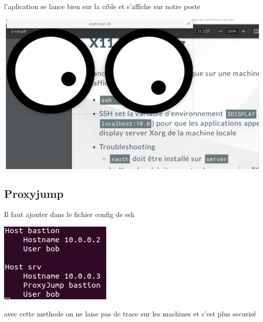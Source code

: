 \documentclass{article}
\begin{document}
 l'aplication se lance bien sur la cible et s'affiche sur notre poste
 
 \begin{center}
        \includegraphics[scale=0.5]{Images/x11result.png}
 \end{center}
 
  
  
  \subsection{\large{Proxyjump}}
  
  Il faut ajouter dans le fichier config de ssh
  
 \begin{center}
        \includegraphics[scale=0.5]{Images/proxyjump.png}
 \end{center}
 
 avec cette methode on ne laise pas de trace sur les machines et c'est plus securisé
 
 
  
\end{document}
